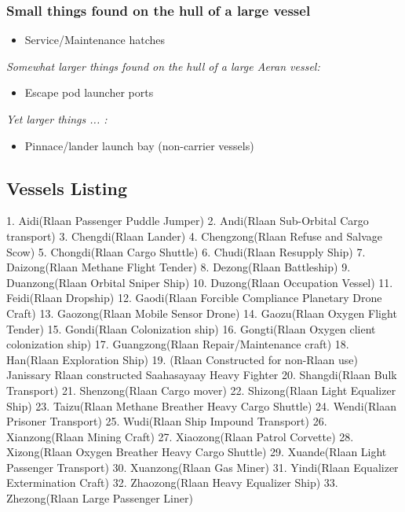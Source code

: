 \subsubsection{Small things found on the hull of a large  vessel}
\begin{itemize}
\item Service/Maintenance hatches
\end{itemize}
{\it Somewhat larger things found on the hull of a large Aeran vessel:}
\begin{itemize}
\item Escape pod launcher ports
\end{itemize}
{\it Yet larger things ... :}
\begin{itemize}
\item Pinnace/lander launch bay (non-carrier vessels)
\end{itemize}

\subsection{Vessels Listing}

    1. Aidi(Rlaan Passenger Puddle Jumper) 
    2. Andi(Rlaan Sub-Orbital Cargo transport) 
    3. Chengdi(Rlaan Lander) 
    4. Chengzong(Rlaan Refuse and Salvage Scow) 
    5. Chongdi(Rlaan Cargo Shuttle) 
    6. Chudi(Rlaan Resupply Ship) 
    7. Daizong(Rlaan Methane Flight Tender) 
    8. Dezong(Rlaan Battleship) 
    9. Duanzong(Rlaan Orbital Sniper Ship) 
    10. Duzong(Rlaan Occupation Vessel) 
    11. Feidi(Rlaan Dropship) 
    12. Gaodi(Rlaan Forcible Compliance Planetary Drone Craft) 
    13. Gaozong(Rlaan Mobile Sensor Drone) 
    14. Gaozu(Rlaan Oxygen Flight Tender) 
    15. Gondi(Rlaan Colonization ship) 
    16. Gongti(Rlaan Oxygen client colonization ship) 
    17. Guangzong(Rlaan Repair/Maintenance craft) 
    18. Han(Rlaan Exploration Ship) 
    19. (Rlaan Constructed for non-Rlaan use) Janissary {Rlaan constructed Saahasayaay Heavy Fighter} 
    20. Shangdi(Rlaan Bulk Transport) 
    21. Shenzong(Rlaan Cargo mover) 
    22. Shizong(Rlaan Light Equalizer Ship) 
    23. Taizu(Rlaan Methane Breather Heavy Cargo Shuttle) 
    24. Wendi(Rlaan Prisoner Transport) 
    25. Wudi(Rlaan Ship Impound Transport) 
    26. Xianzong(Rlaan Mining Craft) 
    27. Xiaozong(Rlaan Patrol Corvette) 
    28. Xizong(Rlaan Oxygen Breather Heavy Cargo Shuttle) 
    29. Xuande(Rlaan Light Passenger Transport) 
    30. Xuanzong(Rlaan Gas Miner) 
    31. Yindi(Rlaan Equalizer Extermination Craft) 
    32. Zhaozong(Rlaan Heavy Equalizer Ship) 
    33. Zhezong(Rlaan Large Passenger Liner) 

